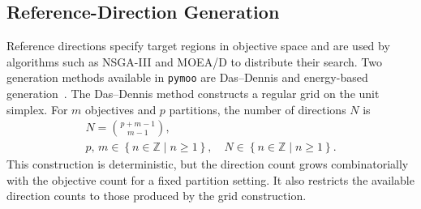 

\subsection{Reference-Direction Generation}
\label{sec:reference_direction_generation}

Reference directions specify target regions in objective space and are used
by algorithms such as NSGA-III and MOEA/D to distribute their search.
Two generation methods available in \texttt{pymoo} are Das--Dennis and
energy-based generation~\cite{pymoo}.
The Das--Dennis method constructs a regular grid on the unit simplex.
For $m$ objectives and $p$ partitions, the number of directions $N$ is
\begin{equation}
    \label{eq:binom_count}
    \begin{gathered}
        N = \binom{p+m-1}{m-1},
        \\[4pt]
        p,\, m \in \left\{ n \in \mathbb{Z} \mid n \ge 1 \right\},
        \quad
        N \in \left\{ n \in \mathbb{Z} \mid n \ge 1 \right\}.
    \end{gathered}
\end{equation}
This construction is deterministic, but the direction count grows
combinatorially with the objective count for a fixed partition setting.
It also restricts the available direction counts to those produced by
the grid construction.~\cite{pymoo,das_dennis}

